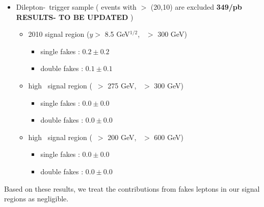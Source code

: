 \begin{itemize}
\item Dilepton-\Ht\ trigger sample ( events with \pt $>$ (20,10) are excluded 
{\bf 349/pb RESULTS- TO BE UPDATED}
)
\begin{itemize}
\item 2010 signal region ($y >$ 8.5 GeV$^{1/2}$, \Ht\ $>$ 300 GeV)
   \begin{itemize} 
   \item single fakes : $0.2 \pm 0.2$
   \item double fakes : $0.1 \pm 0.1$
   \end{itemize}  
\item high \met\ signal region (\met\ $>$ 275 GeV, \Ht\ $>$ 300 GeV)
   \begin{itemize} 
   \item single fakes : $0.0 \pm 0.0$
   \item double fakes : $0.0 \pm 0.0$
   \end{itemize}  
\item high \Ht\ signal region (\met\ $>$ 200 GeV, \Ht\ $>$ 600 GeV)
   \begin{itemize} 
   \item single fakes : $0.0 \pm 0.0$
   \item double fakes : $0.0 \pm 0.0$
   \end{itemize}  
\end{itemize}
\end{itemize}

Based on these results, we treat the contributions from fakes leptons in our signal
regions as negligible.
